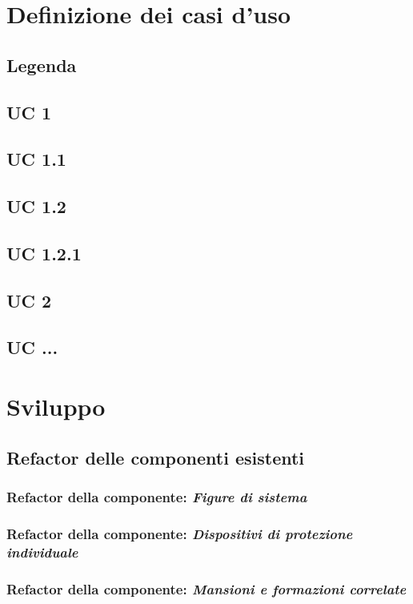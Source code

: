 \section{Definizione dei casi d'uso}
	\subsection{Legenda}
	\subsection{UC 1}
	\subsection{UC 1.1}
	\subsection{UC 1.2}
	\subsection{UC 1.2.1}
	\subsection{UC 2}	
	\subsection{UC ...}

\section{Sviluppo}
\subsection{Refactor delle componenti esistenti}
	
\subsubsection{Refactor della componente: \textit{Figure di sistema}}
\subsubsection{Refactor della componente: \textit{Dispositivi di protezione individuale}}
\subsubsection{Refactor della componente: \textit{Mansioni e formazioni correlate}}

